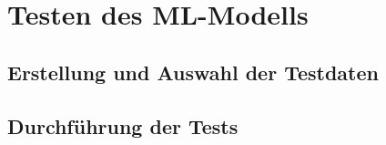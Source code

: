 \section{Testen des ML-Modells}

\subsection{Erstellung und Auswahl der Testdaten}

\subsection{Durchführung der Tests}